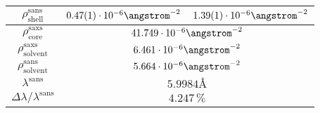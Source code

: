 \documentclass[\main/dresen_thesis.tex]{subfiles}
\begin{document}
\begin{table}[h]
\begin{tabular}{ c | l | l }
      $\rho_\mathrm{shell}^\mathrm{sans}$
        & $0.47(1) \cdot 10^{-6} \angstrom^{-2}$
        & $1.39(1) \cdot 10^{-6} \angstrom^{-2}$\\
      \hline
      $\rho_\mathrm{core}^\mathrm{saxs}$
        & \multicolumn{2}{c}{$41.749 \cdot 10^{-6} \angstrom^{-2}$}\\
      $\rho_\mathrm{solvent}^\mathrm{saxs}$
        & \multicolumn{2}{c}{$6.461 \cdot 10^{-6} \angstrom^{-2}$}\\
      $\rho_\mathrm{solvent}^\mathrm{sans}$
        & \multicolumn{2}{c}{$5.664 \cdot 10^{-6} \angstrom^{-2}$}\\
      $\lambda^\mathrm{sans}$
        & \multicolumn{2}{c}{$5.9984 \unit{\angstrom}$}\\
      $\Delta \lambda / \lambda ^\mathrm{sans}$
        & \multicolumn{2}{c}{$4.247 \, \%$}\\
      \hline
    \end{tabular}
  \end{table}
\end{document}
